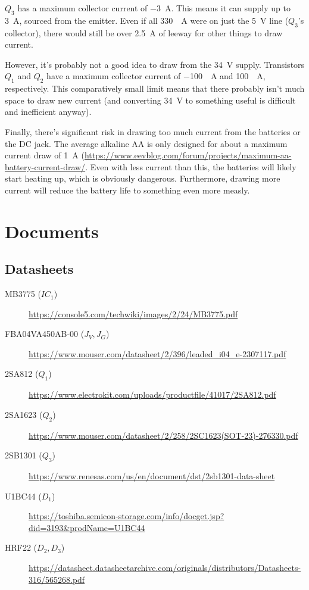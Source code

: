 \documentclass{article}
\begin{document}
$Q_3$ has a maximum collector current of \qty{-3}{A}. This means it
can supply up to \qty{3}{A}, sourced from the emitter. Even if all
\qty{330}{\milli{}A} were on just the \qty{5}{\volt} line ($Q_3$'s
collector), there would still be over \qty{2.5}{A} of leeway for other
things to draw current.

However, it's probably not a good idea to draw from the
\qty{34}{\volt} supply. Transistors $Q_1$ and $Q_2$ have a maximum
collector current of \qty{-100}{\milli{}A} and \qty{100}{\milli{}A},
respectively. This comparatively small limit means that there probably
isn't much space to draw new current (and converting \qty{34}{\volt}
to something useful is difficult and inefficient anyway).

Finally, there's significant risk in drawing too much current from the
batteries or the DC jack. The average alkaline AA is only designed for
about a maximum current draw of \qty{1}{A}
(\url{https://www.eevblog.com/forum/projects/maximum-aa-battery-current-draw/}. Even
with less current than this, the batteries will likely start heating
up, which is obviously dangerous. Furthermore, drawing more current
will reduce the battery life to something even more measly.

\section{Documents}
\label{sec:documents}
\subsection{Datasheets}
\begin{description}
\item[MB3775 ($IC_1$)]
  \url{https://console5.com/techwiki/images/2/24/MB3775.pdf}
\item[FBA04VA450AB-00 ($J_V,J_G$)]
  \url{https://www.mouser.com/datasheet/2/396/leaded_i04_e-2307117.pdf}
\item[2SA812 ($Q_1$)]
  \url{https://www.electrokit.com/uploads/productfile/41017/2SA812.pdf}
\item[2SA1623 ($Q_2$)]
  \url{https://www.mouser.com/datasheet/2/258/2SC1623(SOT-23)-276330.pdf}
\item[2SB1301 ($Q_3$)]
  \url{https://www.renesas.com/us/en/document/dst/2sb1301-data-sheet}
\item[U1BC44 ($D_1$)]
  \url{https://toshiba.semicon-storage.com/info/docget.jsp?did=3193&prodName=U1BC44}
  
\item[HRF22 ($D_2,D_3$)]
  \url{https://datasheet.datasheetarchive.com/originals/distributors/Datasheets-316/565268.pdf}
\end{description}
\end{document}
